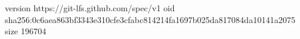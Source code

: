 version https://git-lfs.github.com/spec/v1
oid sha256:0c6aea863bf3343e310cfe3cfabc814214fa1697b025da817084da10141a2075
size 196704
